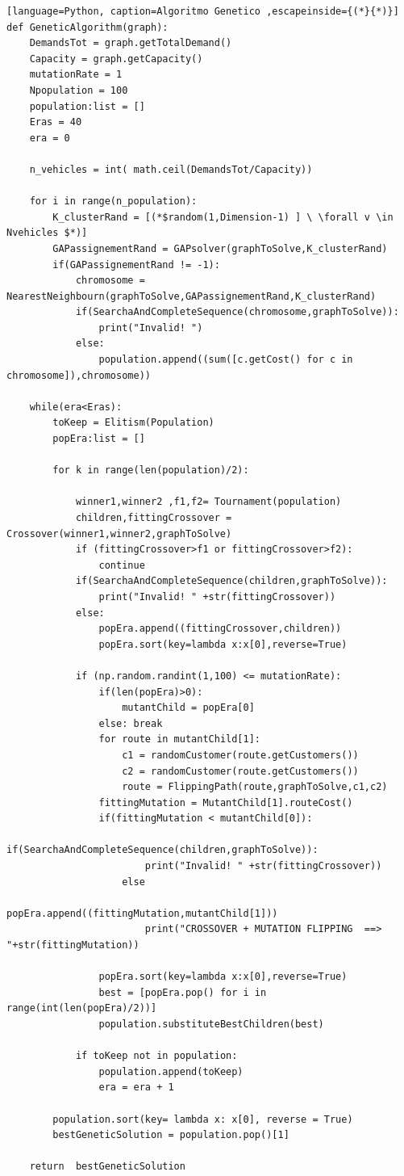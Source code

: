 \documentclass[]{article}
\begin{document}
\begin{lstlisting}[language=Python, caption=Algoritmo Genetico ,escapeinside={(*}{*)}]
def GeneticAlgorithm(graph):
	DemandsTot = graph.getTotalDemand() 
	Capacity = graph.getCapacity()
	mutationRate = 1
	Npopulation = 100
	population:list = []
	Eras = 40
	era = 0
	
	n_vehicles = int( math.ceil(DemandsTot/Capacity))           
	
	for i in range(n_population):
		K_clusterRand = [(*$random(1,Dimension-1) ] \ \forall v \in Nvehicles $*)]
		GAPassignementRand = GAPsolver(graphToSolve,K_clusterRand)
		if(GAPassignementRand != -1):
			chromosome = NearestNeighbourn(graphToSolve,GAPassignementRand,K_clusterRand) 
			if(SearchaAndCompleteSequence(chromosome,graphToSolve)):
				print("Invalid! ")
			else:
				population.append((sum([c.getCost() for c in chromosome]),chromosome))
			
	while(era<Eras):
		toKeep = Elitism(Population)
		popEra:list = []
		
		for k in range(len(population)/2):
		
			winner1,winner2 ,f1,f2= Tournament(population)   
			children,fittingCrossover = Crossover(winner1,winner2,graphToSolve)
			if (fittingCrossover>f1 or fittingCrossover>f2):
				continue			
			if(SearchaAndCompleteSequence(children,graphToSolve)):
				print("Invalid! " +str(fittingCrossover))
			else:
				popEra.append((fittingCrossover,children))
				popEra.sort(key=lambda x:x[0],reverse=True)	
						
			if (np.random.randint(1,100) <= mutationRate):
			    if(len(popEra)>0):
			    	mutantChild = popEra[0]
			    else: break 
				for route in mutantChild[1]:
					c1 = randomCustomer(route.getCustomers())
					c2 = randomCustomer(route.getCustomers())
					route = FlippingPath(route,graphToSolve,c1,c2)					
				fittingMutation = MutantChild[1].routeCost()
				if(fittingMutation < mutantChild[0]):
					if(SearchaAndCompleteSequence(children,graphToSolve)):
						print("Invalid! " +str(fittingCrossover))
					else
						popEra.append((fittingMutation,mutantChild[1]))
						print("CROSSOVER + MUTATION FLIPPING  ==> "+str(fittingMutation))
										
				popEra.sort(key=lambda x:x[0],reverse=True)
				best = [popEra.pop() for i in range(int(len(popEra)/2))]			
				population.substituteBestChildren(best)
			
			if toKeep not in population:
				population.append(toKeep)
				era = era + 1
			
		population.sort(key= lambda x: x[0], reverse = True)
		bestGeneticSolution = population.pop()[1]    
	
	return 	bestGeneticSolution
\end{lstlisting}
\end{document}
